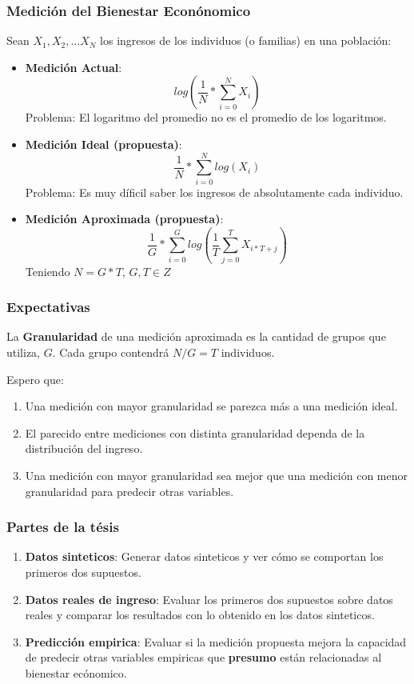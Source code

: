\documentclass[10pt,mathserif]{beamer}%
\begin{document}
\begin{frame}
\frametitle{Medición del Bienestar Econónomico}
    Sean $X_1, X_2, \dots X_N$ los ingresos de los individuos (o familias) en una población:
    \begin{itemize}
        \item \textbf{Medición Actual}: 
        $$ 
        log(\frac{1}{N} * \sum_{i=0}^N X_i)
        $$
        Problema: El logaritmo del promedio no es el promedio de los logaritmos.
        \pause
        \item \textbf{Medición Ideal (propuesta)}:
        $$
        \frac{1}{N} * \sum_{i=0}^N log(X_i)
        $$
        Problema: Es muy díficil saber los ingresos de absolutamente cada individuo.
        \pause
        \item \textbf{Medición Aproximada (propuesta)}:
        $$
        \frac{1}{G} * \sum_{i=0}^G log(\frac{1}{T} \sum_{j = 0}^{T} X_{i*T+j})
        $$
        Teniendo $N = G * T$, $G, T \in Z$
    \end{itemize}
\end{frame}

\begin{frame}
    \frametitle{Expectativas}
    \begin{definition}[Granularidad]
        La \textbf{Granularidad} de una medición aproximada es la cantidad de grupos que utiliza, $G$.
        Cada grupo contendrá $N/G = T$ individuos.
    \end{definition}

    Espero que:
    \pause
    \begin{enumerate}
        \item Una medición con mayor granularidad se parezca más a una medición ideal. 
        \pause
        \item El parecido entre mediciones con distinta granularidad dependa de la distribución del ingreso.
        \pause 
        \item Una medición con mayor granularidad sea mejor que una medición con menor granularidad para predecir otras variables.
    \end{enumerate}

\end{frame}

\begin{frame}
    \frametitle{Partes de la tésis}
    \begin{enumerate}
        \item \textbf{Datos sinteticos}: Generar datos sinteticos y ver cómo se comportan los primeros dos supuestos.
        \item \textbf{Datos reales de ingreso}: Evaluar los primeros dos supuestos sobre datos reales y comparar los resultados con lo obtenido en los datos sinteticos.
        \item \textbf{Predicción empirica}: Evaluar si la medición propuesta mejora la capacidad de predecir otras variables empiricas que \textbf{presumo} están relacionadas al bienestar ecónomico.
    \end{enumerate}
\end{frame}
\end{document}
